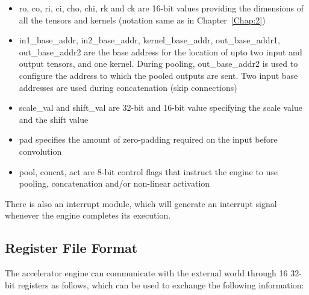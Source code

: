 \documentclass[a4paper,12pt, final]{report}
\begin{document}
\begin{itemize}
	\item ro, co, ri, ci, cho, chi, rk and ck are 16-bit values providing the dimensions of all the tensors and kernels (notation same as in Chapter~\ref{Chap:2})
	\item in1\_base\_addr, in2\_base\_addr, kernel\_base\_addr, out\_base\_addr1, out\_base\_addr2 are the base address for the location of upto two input and output tensors, and one kernel. During pooling, out\_base\_addr2 is used to configure the address to which the pooled outputs are sent. Two input base addresses are used during concatenation (skip connections)
	\item scale\_val and shift\_val are 32-bit and 16-bit value specifying the scale value and the shift value
	\item pad specifies the amount of zero-padding required on the input before convolution
	\item pool, concat, act are 8-bit control flags that instruct the engine to use pooling, concatenation and/or non-linear activation
\end{itemize}

There is also an interrupt module, which will generate an interrupt signal whenever the engine completes its execution.

\subsection{Register File Format}


The accelerator engine can communicate with the external world through 16 32-bit registers as follows, which can be used to exchange the following information:
\end{document}
